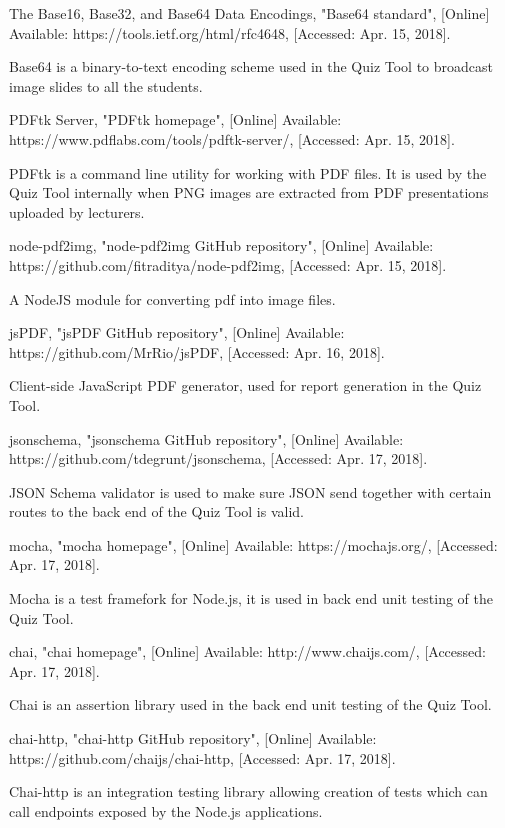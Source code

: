 \documentclass[11pt,a4paper]{report}
\begin{document}
\begin{thebibliography}{1}
 The Base16, Base32, and Base64 Data Encodings, "Base64 standard", [Online] Available: https://tools.ietf.org/html/rfc4648, [Accessed: Apr. 15, 2018].

    Base64 is a binary-to-text encoding scheme used in the Quiz Tool to broadcast image slides to all the students.

 PDFtk Server, "PDFtk homepage", [Online] Available: https://www.pdflabs.com/tools/pdftk-server/, [Accessed: Apr. 15, 2018].

    PDFtk is a command line utility for working with PDF files. It is used by the Quiz Tool internally when PNG images are extracted
    from PDF presentations uploaded by lecturers.

 node-pdf2img, "node-pdf2img GitHub repository", [Online] Available: https://github.com/fitraditya/node-pdf2img, [Accessed: Apr. 15, 2018].

    A NodeJS module for converting pdf into image files.

 jsPDF, "jsPDF GitHub repository", [Online] Available: https://github.com/MrRio/jsPDF, [Accessed: Apr. 16, 2018].

    Client-side JavaScript PDF generator, used for report generation in the Quiz Tool.

 jsonschema, "jsonschema GitHub repository", [Online] Available: https://github.com/tdegrunt/jsonschema, [Accessed: Apr. 17, 2018].

    JSON Schema validator is used to make sure JSON send together with certain routes to the back end of the Quiz Tool is valid.

 mocha, "mocha homepage", [Online] Available: https://mochajs.org/, [Accessed: Apr. 17, 2018].

    Mocha is a test framefork for Node.js, it is used in back end unit testing of the Quiz Tool.

 chai, "chai homepage", [Online] Available: http://www.chaijs.com/, [Accessed: Apr. 17, 2018].

    Chai is an assertion library used in the back end unit testing of the Quiz Tool.

 chai-http, "chai-http GitHub repository", [Online] Available: https://github.com/chaijs/chai-http, [Accessed: Apr. 17, 2018].

    Chai-http is an integration testing library allowing creation of tests which can call endpoints exposed by the Node.js
    applications.


\end{thebibliography}
\end{document}
